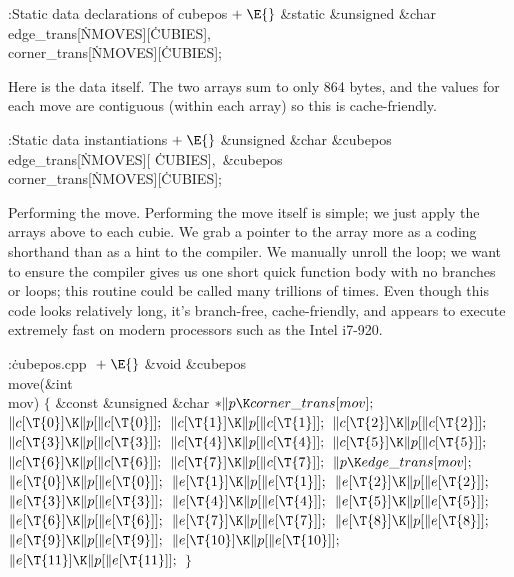 \Y\B\4:Static data declarations of cubepos\X${}\mathrel+\E{}$\6
\&{static} \&{unsigned} \&{char} \\{edge\_trans}[\.{NMOVES}][\.{CUBIES}]${},{}$
\\{corner\_trans}[\.{NMOVES}][\.{CUBIES}];\par
\fi

Here is the data itself.
The two arrays sum to only 864 bytes, and the values for each move are
contiguous (within each array) so this is cache-friendly.

\Y\B\4:Static data instantiations\X${}\mathrel+\E{}$\6
\&{unsigned} \&{char} \&{cubepos}\DC\\{edge\_trans}[\.{NMOVES}][%
\.{CUBIES}]${},{}$ \&{cubepos}\DC\\{corner\_trans}[\.{NMOVES}][\.{CUBIES}];\par
\fi

Performing the move.
Performing the move itself is simple; we just apply the arrays above
to each cubie.  We grab a pointer to the array more as a coding
shorthand than as a hint to the compiler.  We manually unroll the
loop; we want to ensure the compiler gives us one short quick function
body with no branches or loops; this routine could be called many
trillions of times.  Even though this code looks relatively long, it's
branch-free, cache-friendly, and appears to execute extremely fast on
modern processors such as the Intel i7-920.

\Y\B\4:\.{cubepos.cpp }\X${}\mathrel+\E{}$\6
\&{void} \&{cubepos}\DC\\{move}(\&{int} \\{mov})\1\1\2\2\6
${}\{{}$\1\6
\&{const} \&{unsigned} \&{char} ${}{*}\|p\K\\{corner\_trans}[\\{mov}];{}$\7
${}\|c[\T{0}]\K\|p[\|c[\T{0}]];{}$\6
${}\|c[\T{1}]\K\|p[\|c[\T{1}]];{}$\6
${}\|c[\T{2}]\K\|p[\|c[\T{2}]];{}$\6
${}\|c[\T{3}]\K\|p[\|c[\T{3}]];{}$\6
${}\|c[\T{4}]\K\|p[\|c[\T{4}]];{}$\6
${}\|c[\T{5}]\K\|p[\|c[\T{5}]];{}$\6
${}\|c[\T{6}]\K\|p[\|c[\T{6}]];{}$\6
${}\|c[\T{7}]\K\|p[\|c[\T{7}]];{}$\6
${}\|p\K\\{edge\_trans}[\\{mov}];{}$\6
${}\|e[\T{0}]\K\|p[\|e[\T{0}]];{}$\6
${}\|e[\T{1}]\K\|p[\|e[\T{1}]];{}$\6
${}\|e[\T{2}]\K\|p[\|e[\T{2}]];{}$\6
${}\|e[\T{3}]\K\|p[\|e[\T{3}]];{}$\6
${}\|e[\T{4}]\K\|p[\|e[\T{4}]];{}$\6
${}\|e[\T{5}]\K\|p[\|e[\T{5}]];{}$\6
${}\|e[\T{6}]\K\|p[\|e[\T{6}]];{}$\6
${}\|e[\T{7}]\K\|p[\|e[\T{7}]];{}$\6
${}\|e[\T{8}]\K\|p[\|e[\T{8}]];{}$\6
${}\|e[\T{9}]\K\|p[\|e[\T{9}]];{}$\6
${}\|e[\T{10}]\K\|p[\|e[\T{10}]];{}$\6
${}\|e[\T{11}]\K\|p[\|e[\T{11}]];{}$\6
\4${}\}{}$\2\par
\fi

